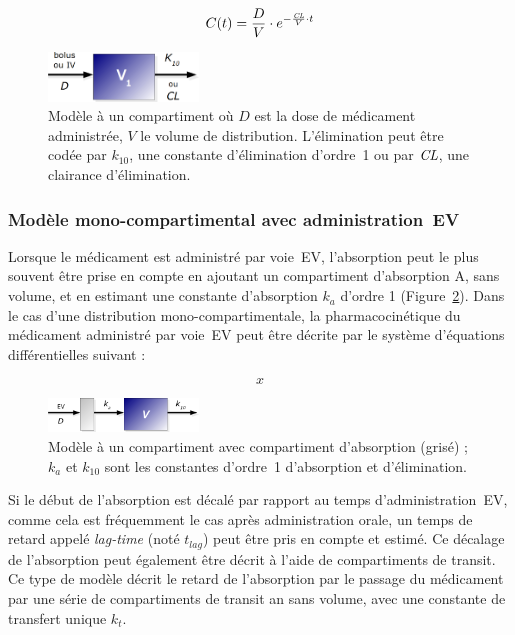 \begin{equation}
C(t) = \frac{D}{V} \cdot e^{-\frac{\operatorname{\textit{CL}}}{V}\cdot t}
\label{eq:18}
\end{equation}

\begin{figure}[htbp]
	\centering
		\includegraphics[width=4cm]{figures/raster/FIG_2}
	\caption[Modèle à un compartiment]{Modèle à un compartiment où $D$ est la dose de médicament administrée, $V$ le volume de distribution. L'élimination peut être codée par $k_{10}$, une constante d'élimination d'ordre~1 ou par $\operatorname{\textit{CL}}$, une clairance d'élimination.}
	\label{fig:2}
\end{figure}

\subsubsection{Modèle mono-compartimental avec administration~EV}
Lorsque le médicament est administré par voie~EV, l'absorption peut le plus souvent être prise en compte en ajoutant un compartiment d'absorption A, sans volume, et en estimant une constante d'absorption $k_{a}$ d'ordre 1 (Figure~\ref{fig:3}). Dans le cas d'une distribution mono-compartimentale, la pharmacocinétique du médicament administré par voie~EV peut être décrite par le système d'équations différentielles suivant :

\begin{equation}
x
\label{eq:19}
\end{equation}

\begin{figure}[htbp]
	\centering
		\includegraphics[width=4cm]{figures/raster/FIG_3}
	\caption[Modèle à un compartiment avec compartiment d'absorption]{Modèle à un compartiment avec compartiment d'absorption (grisé) ; $k_{a}$ et $k_{10}$ sont les constantes d'ordre~1 d'absorption et d'élimination.}
	\label{fig:3}
\end{figure}

Si le début de l'absorption est décalé par rapport au temps d'administration~EV, comme cela est fréquemment le cas après administration orale, un temps de retard appelé \textit{lag-time} (noté $t_{lag}$) peut être pris en compte et estimé. Ce décalage de l'absorption peut également être décrit à l'aide de compartiments de transit. Ce type de modèle décrit le retard de l'absorption par le passage du médicament par une série de compartiments de transit an sans volume, avec une constante de transfert unique $k_t$.

